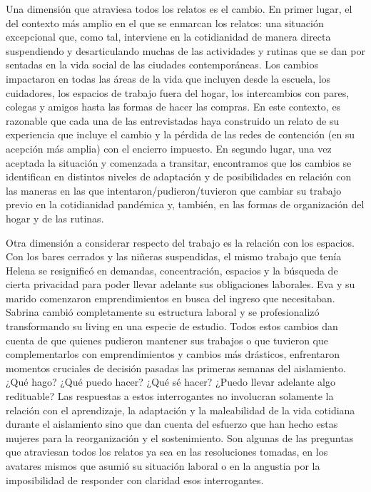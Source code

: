 \begin{refsection}
Una dimensión que atraviesa todos los relatos es el cambio. En primer lugar, el del contexto más amplio en el que se enmarcan los relatos: una situación excepcional que, como tal, interviene en la cotidianidad de manera directa suspendiendo y desarticulando muchas de las actividades y rutinas que se dan por sentadas en la vida social de las ciudades contemporáneas. Los cambios impactaron en todas las áreas de la vida que incluyen desde la escuela, los cuidadores, los espacios de trabajo fuera del hogar, los intercambios con pares, colegas y amigos hasta las formas de hacer las compras. En este contexto, es razonable que cada una de las entrevistadas haya construido un relato de su experiencia que incluye el cambio y la pérdida de las redes de contención (en su acepción más amplia) con el encierro impuesto. En segundo lugar, una vez aceptada la situación y comenzada a transitar, encontramos que los cambios se identifican en distintos niveles de adaptación y de posibilidades en relación con las maneras en las que intentaron/pudieron/tuvieron que cambiar su trabajo previo en la cotidianidad pandémica y, también, en las formas de organización del hogar y de las rutinas.

Otra dimensión a considerar respecto del trabajo es la relación con los espacios. Con los bares cerrados y las niñeras suspendidas, el mismo trabajo que tenía Helena se resignificó en demandas, concentración, espacios y la búsqueda de cierta privacidad para poder llevar adelante sus obligaciones laborales. Eva y su marido comenzaron emprendimientos en busca del ingreso que necesitaban. Sabrina cambió completamente su estructura laboral y se profesionalizó transformando su living en una especie de estudio. Todos estos cambios dan cuenta de que quienes pudieron mantener sus trabajos o que tuvieron que complementarlos con emprendimientos y cambios más drásticos, enfrentaron momentos cruciales de decisión pasadas las primeras semanas del aislamiento. ¿Qué hago? ¿Qué puedo hacer? ¿Qué sé hacer? ¿Puedo llevar adelante algo redituable? Las respuestas a estos interrogantes no involucran solamente la relación con el aprendizaje, la adaptación y la maleabilidad de la vida cotidiana durante el aislamiento sino que dan cuenta del esfuerzo que han hecho estas mujeres para la reorganización y el sostenimiento. Son algunas de las preguntas que atraviesan todos los relatos ya sea en las resoluciones tomadas, en los avatares mismos que asumió su situación laboral o en la angustia por la imposibilidad de responder con claridad esos interrogantes.


\end{refsection}
